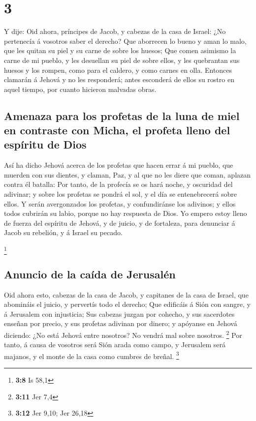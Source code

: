 \hypertarget{section-2}{%
\section{3}\label{section-2}}

 Y dije: Oid ahora, príncipes de Jacob, y cabezas de la
casa de Israel: ¿No pertenecía á vosotros saber el derecho?
 Que aborrecen lo bueno y aman lo malo, que les quitan su
piel y su carne de sobre los huesos;  Que comen asimismo
la carne de mi pueblo, y les desuellan su piel de sobre ellos, y les
quebrantan sus huesos y los rompen, como para el caldero, y como carnes
en olla.  Entonces clamarán á Jehová y no les responderá;
antes esconderá de ellos su rostro en aquel tiempo, por cuanto hicieron
malvadas obras.

\hypertarget{amenaza-para-los-profetas-de-la-luna-de-miel-en-contraste-con-micha-el-profeta-lleno-del-espuxedritu-de-dios}{%
\subsection{Amenaza para los profetas de la luna de miel en contraste
con Micha, el profeta lleno del espíritu de
Dios}\label{amenaza-para-los-profetas-de-la-luna-de-miel-en-contraste-con-micha-el-profeta-lleno-del-espuxedritu-de-dios}}

 Así ha dicho Jehová acerca de los profetas que hacen
errar á mi pueblo, que muerden con sus dientes, y claman, Paz, y al que
no les diere que coman, aplazan contra él batalla:  Por
tanto, de la profecía se os hará noche, y oscuridad del adivinar; y
sobre los profetas se pondrá el sol, y el día se entenebrecerá sobre
ellos.  Y serán avergonzados los profetas, y confundiránse
los adivinos; y ellos todos cubrirán su labio, porque no hay respuesta
de Dios.  Yo empero estoy lleno de fuerza del espíritu de
Jehová, y de juicio, y de fortaleza, para denunciar á Jacob su rebelión,
y á Israel su pecado.

\footnote{\textbf{3:8} Is 58,1}

\hypertarget{anuncio-de-la-cauxedda-de-jerusaluxe9n}{%
\subsection{Anuncio de la caída de
Jerusalén}\label{anuncio-de-la-cauxedda-de-jerusaluxe9n}}

 Oid ahora esto, cabezas de la casa de Jacob, y capitanes
de la casa de Israel, que abomináis el juicio, y pervertís todo el
derecho;  Que edificáis á Sión con sangre, y á Jerusalem
con injusticia;  Sus cabezas juzgan por cohecho, y sus
sacerdotes enseñan por precio, y sus profetas adivinan por dinero; y
apóyanse en Jehová diciendo: ¿No está Jehová entre nosotros? No vendrá
mal sobre nosotros. \footnote{\textbf{3:11} Jer 7,4}  Por
tanto, á causa de vosotros será Sión arada como campo, y Jerusalem será
majanos, y el monte de la casa como cumbres de breñal. \footnote{\textbf{3:12}
  Jer 9,10; Jer 26,18}

